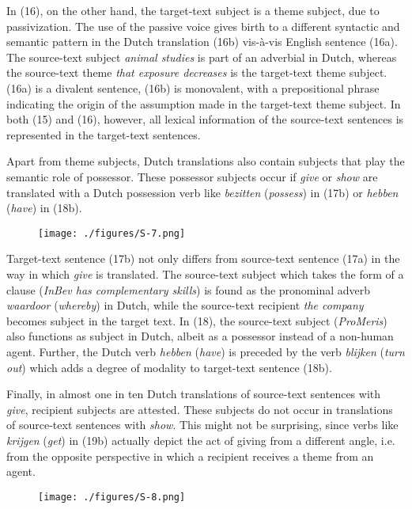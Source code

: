 \documentclass[output=paper]{LSP/langsci}
\begin{document}
In (16), on the other hand, the target-text subject is a theme subject, due to passivization. The use of the passive voice gives birth to a different syntactic and semantic pattern in the Dutch translation (16b) vis-à-vis English sentence (16a). The source-text subject \textit{animal studies} is part of an adverbial in Dutch, whereas the source-text theme \textit{that exposure decreases} is the target-text theme subject. (16a) is a divalent sentence, (16b) is monovalent, with a prepositional phrase indicating the origin of the assumption made in the target-text theme subject. In both (15) and (16), however, all lexical information of the source-text sentences is represented in the target-text sentences.    

Apart from theme subjects, Dutch translations also contain subjects that play the semantic role of possessor. These possessor subjects occur if \textit{give} or \textit{show} are translated with a Dutch possession verb like \textit{bezitten} (\textit{possess}) in (17b) or \textit{hebben} (\textit{have}) in (18b).  

\begin{figure}
\texttt{[image: ./figures/S-7.png]}
\end{figure}


Target-text sentence (17b) not only differs from source-text sentence (17a) in the way in which \textit{give} is translated. The source-text subject which takes the form of a clause (\textit{InBev has complementary skills}) is found as the pronominal adverb \textit{waardoor} (\textit{whereby}) in Dutch, while the source-text recipient \textit{the company} becomes subject in the target text. In (18), the source-text subject (\textit{ProMeris}) also functions as subject in Dutch, albeit as a possessor instead of a non-human agent. Further, the Dutch verb \textit{hebben} (\textit{have}) is preceded by the verb \textit{blijken} (\textit{turn out}) which adds a degree of modality to target-text sentence (18b). 

Finally, in almost one in ten Dutch translations of source-text sentences with \textit{give}, recipient subjects are attested. These subjects do not occur in translations of source-text sentences with \textit{show}. This might not be surprising, since verbs like \textit{krijgen} (\textit{get}) in (19b) actually depict the act of giving from a different angle, i.e. from the opposite perspective in which a recipient receives a theme from an agent.   

\begin{figure}
\texttt{[image: ./figures/S-8.png]}
\end{figure}
\end{document}
